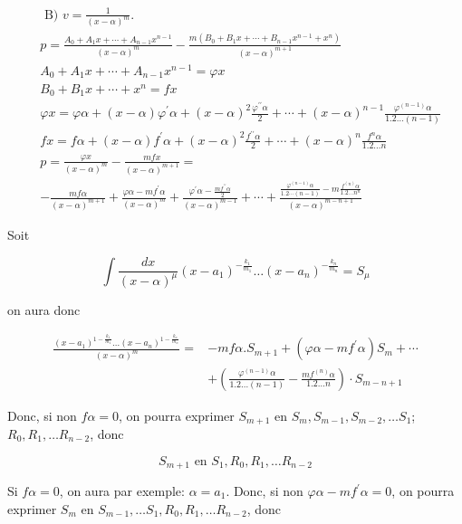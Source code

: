 \documentclass{article}
\begin{document}
\[
\begin{aligned}
& \text { B) } v=\frac{1}{(x-\alpha)^{m}} \text {. } \\
& p=\frac{A_{0}+A_{1} x+\cdots+A_{n-1} x^{n-1}}{(x-\alpha)^{m}}-\frac{m\left(B_{0}+B_{1} x+\cdots+B_{n-1} x^{n-1}+x^{n}\right)}{(x-\alpha)^{m+1}} \\
& A_{0}+A_{1} x+\cdots+A_{n-1} x^{n-1}=\varphi x \\
& B_{0}+B_{1} x+\cdots+x^{n}=f x \\
& \varphi x=\varphi \alpha+(x-\alpha) \varphi^{\prime} \alpha+(x-\alpha)^{2} \frac{\varphi^{\prime \prime} \alpha}{2}+\cdots+(x-\alpha)^{n-1} \frac{\varphi^{(n-1)} \alpha}{1.2 \ldots(n-1)} \\
& f x=f \alpha+(x-\alpha) f^{\prime} \alpha+(x-\alpha)^{2} \frac{f^{\prime \prime} \alpha}{2}+\cdots+(x-\alpha)^{n} \frac{f^{n} \alpha}{1.2 \ldots n} \\
& p=\frac{\varphi x}{(x-\alpha)^{m}}-\frac{m f x}{(x-\alpha)^{m+1}}= \\
& -\frac{m f \alpha}{(x-\alpha)^{m+1}}+\frac{\varphi \alpha-m f^{\prime} \alpha}{(x-\alpha)^{m}}+\frac{\varphi^{\prime} \alpha-\frac{m f^{\prime \prime} \alpha}{2}}{(x-\alpha)^{m-1}}+\cdots+\frac{\frac{\varphi^{(n-1)} \alpha}{1.2 \cdots(n-1)}-m \frac{f^{(n)} \alpha}{1.2 \ldots n^{n}}}{(x-\alpha)^{m-n+1}}
\end{aligned}
\]

Soit

\[
\int \frac{d x}{(x-\alpha)^{\mu}}\left(x-a_{1}\right)^{-\frac{k_{1}}{m_{1}}} \ldots\left(x-a_{n}\right)^{-\frac{k_{n}}{m_{n}}}=S_{\mu}
\]

on aura donc

\[
\begin{aligned}
\frac{\left(x-a_{1}\right)^{1-\frac{k_{1}}{m_{1}}} \ldots\left(x-a_{n}\right)^{1-\frac{k_{n}}{m_{n}}}}{(x-\alpha)^{m}}= & -m f \alpha . S_{m+1}+\left(\varphi \alpha-m f^{\prime} \alpha\right) S_{m}+\cdots \\
& +\left(\frac{\varphi^{(n-1)} \alpha}{1.2 \ldots(n-1)}-\frac{m f^{(n)} \alpha}{1.2 \ldots n}\right) \cdot S_{m-n+1}
\end{aligned}
\]

Donc, si non \(f \alpha=0\), on pourra exprimer \(S_{m+1}\) en \(S_{m}, S_{m-1}, S_{m-2}, \ldots S_{1}\); \(R_{0}, R_{1}, \ldots R_{n-2}\), donc

\[
S_{m+1} \text { en } S_{1}, R_{0}, R_{1}, \ldots R_{n-2}
\]

Si \(f \alpha=0\), on aura par exemple: \(\alpha=a_{1}\). Donc, si non \(\varphi \alpha-m f^{\prime} \alpha=0\), on pourra exprimer \(S_{m}\) en \(S_{m-1}, \ldots S_{1}, R_{0}, R_{1}, \ldots R_{n-2}\), donc
\end{document}
